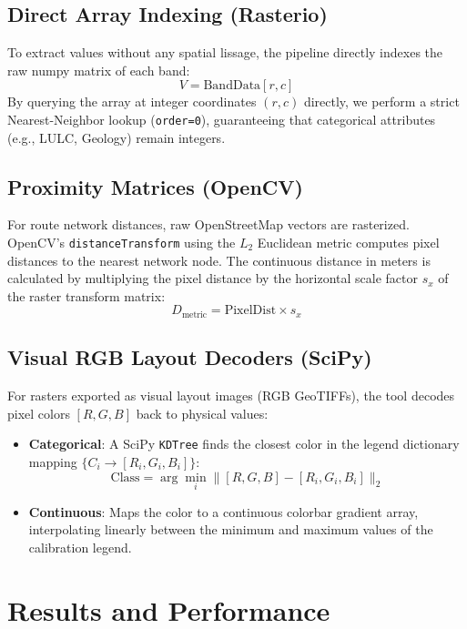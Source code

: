 \documentclass[11pt,twocolumn,a4paper]{article}
\begin{document}
\subsection{Direct Array Indexing (Rasterio)}
To extract values without any spatial lissage, the pipeline directly indexes the raw numpy matrix of each band:
\begin{equation}
    V = \text{BandData}[r, c]
\end{equation}
By querying the array at integer coordinates $(r, c)$ directly, we perform a strict Nearest-Neighbor lookup (\texttt{order=0}), guaranteeing that categorical attributes (e.g., LULC, Geology) remain integers.

\subsection{Proximity Matrices (OpenCV)}
For route network distances, raw OpenStreetMap vectors are rasterized. OpenCV's \texttt{distanceTransform} using the $L_2$ Euclidean metric computes pixel distances to the nearest network node. The continuous distance in meters is calculated by multiplying the pixel distance by the horizontal scale factor $s_x$ of the raster transform matrix:
\begin{equation}
    D_{\text{metric}} = \text{PixelDist} \times s_x
\end{equation}

\subsection{Visual RGB Layout Decoders (SciPy)}
For rasters exported as visual layout images (RGB GeoTIFFs), the tool decodes pixel colors $[R, G, B]$ back to physical values:
\begin{itemize}
    \item \textbf{Categorical}: A SciPy \texttt{KDTree} finds the closest color in the legend dictionary mapping $\{C_i \rightarrow [R_i, G_i, B_i]\}$:
    \begin{equation}
        \text{Class} = \arg\min_{i} \| [R, G, B] - [R_i, G_i, B_i] \|_2
    \end{equation}
    \item \textbf{Continuous}: Maps the color to a continuous colorbar gradient array, interpolating linearly between the minimum and maximum values of the calibration legend.
\end{itemize}

\section{Results and Performance}
\end{document}
